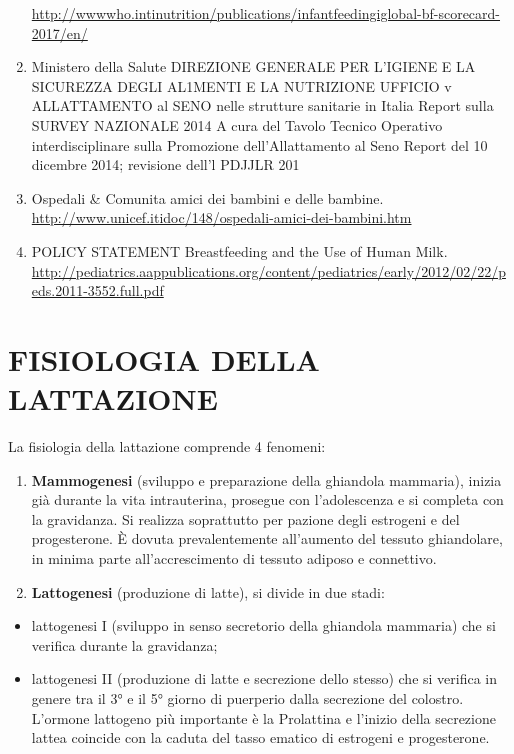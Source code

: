 \documentclass[]{article}
\begin{document}
\begin{enumerate}
  \url{http://wwwwho.intinutrition/publications/infantfeedingiglobal-bf-scorecard-2017/en/}
\item
  Ministero della Salute DIREZIONE GENERALE PER L'IGIENE E LA SICUREZZA
  DEGLI AL1MENTI E LA NUTRIZIONE UFFICIO v ALLATTAMENTO al SENO nelle
  strutture sanitarie in Italia Report sulla SURVEY NAZIONALE 2014 A
  cura del Tavolo Tecnico Operativo interdisciplinare sulla Promozione
  dell'Allattamento al Seno Report del 10 dicembre 2014; revisione
  dell'l PDJJLR 201
\item
  Ospedali \& Comunita amici dei bambini e delle bambine.
  \url{http://www.unicef.itidoc/148/ospedali-amici-dei-bambini.htm}
\item
  POLICY STATEMENT Breastfeeding and the Use of Human Milk.
  \url{http://pediatrics.aappublications.org/content/pediatrics/early/2012/02/22/peds.2011-3552.full.pdf}
\end{enumerate}

\hypertarget{fisiologia-della-lattazione}{%
\section{FISIOLOGIA DELLA
LATTAZIONE}\label{fisiologia-della-lattazione}}

La fisiologia della lattazione comprende 4 fenomeni:

\begin{enumerate}
\def\labelenumi{\arabic{enumi}.}
\item
  \textbf{Mammogenesi} (sviluppo e preparazione della ghiandola
  mammaria), inizia già durante la vita intrauterina, prosegue con
  l'adolescenza e si completa con la gravidanza. Si realizza soprattutto
  per pazione degli estrogeni e del progesterone. È dovuta
  prevalentemente all'aumento del tessuto ghiandolare, in minima parte
  all'accrescimento di tessuto adiposo e connettivo.
\item
  \textbf{Lattogenesi} (produzione di latte), si divide in due stadi:
\end{enumerate}

\begin{itemize}
\item
  {lattogenesi I} (sviluppo in senso secretorio della ghiandola
  mammaria) che si verifica durante la gravidanza;
\item
  {lattogenesi II} (produzione di latte e secrezione dello stesso) che
  si verifica in genere tra il 3° e il 5° giorno di puerperio dalla
  secrezione del colostro. L'ormone lattogeno più importante è la
  Prolattina e l'inizio della secrezione lattea coincide con la caduta
  del tasso ematico di estrogeni e progesterone.
\end{itemize}
\end{document}
